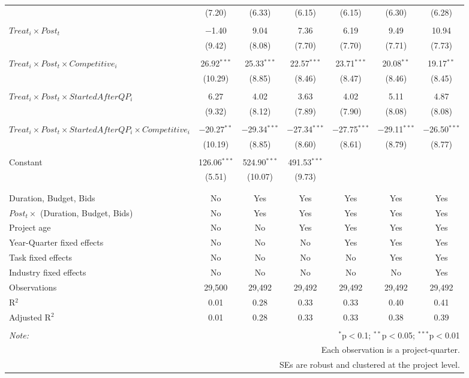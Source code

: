 \documentclass[
]{article}
\begin{document}
\begin{table}[H]
\begin{tabular}{@{\extracolsep{-3pt}}lcccccc}
  & (7.20) & (6.33) & (6.15) & (6.15) & (6.30) & (6.28) \\ 
  & & & & & & \\ 
 $Treat_i \times Post_t$ & $-$1.40 & 9.04 & 7.36 & 6.19 & 9.49 & 10.94 \\ 
  & (9.42) & (8.08) & (7.70) & (7.70) & (7.71) & (7.73) \\ 
  & & & & & & \\ 
 $Treat_i \times Post_t \times Competitive_i$ & 26.92$^{***}$ & 25.33$^{***}$ & 22.57$^{***}$ & 23.71$^{***}$ & 20.08$^{**}$ & 19.17$^{**}$ \\ 
  & (10.29) & (8.85) & (8.46) & (8.47) & (8.46) & (8.45) \\ 
  & & & & & & \\ 
 $Treat_i \times Post_t \times StartedAfterQP_i$ & 6.27 & 4.02 & 3.63 & 4.02 & 5.11 & 4.87 \\ 
  & (9.32) & (8.12) & (7.89) & (7.90) & (8.08) & (8.08) \\ 
  & & & & & & \\ 
 $Treat_i \times Post_t \times StartedAfterQP_i \times Competitive_i$ & $-$20.27$^{**}$ & $-$29.34$^{***}$ & $-$27.34$^{***}$ & $-$27.75$^{***}$ & $-$29.11$^{***}$ & $-$26.50$^{***}$ \\ 
  & (10.19) & (8.85) & (8.60) & (8.61) & (8.79) & (8.77) \\ 
  & & & & & & \\ 
 Constant & 126.06$^{***}$ & 524.90$^{***}$ & 491.53$^{***}$ &  &  &  \\ 
  & (5.51) & (10.07) & (9.73) &  &  &  \\ 
  & & & & & & \\ 
\hline \\[-1.8ex] 
Duration, Budget, Bids & No & Yes & Yes & Yes & Yes & Yes \\ 
$Post_t \times $  (Duration, Budget, Bids) & No & Yes & Yes & Yes & Yes & Yes \\ 
Project age & No & No & Yes & Yes & Yes & Yes \\ 
Year-Quarter fixed effects & No & No & No & Yes & Yes & Yes \\ 
Task fixed effects & No & No & No & No & Yes & Yes \\ 
Industry fixed effects & No & No & No & No & No & Yes \\ 
Observations & 29,500 & 29,492 & 29,492 & 29,492 & 29,492 & 29,492 \\ 
R$^{2}$ & 0.01 & 0.28 & 0.33 & 0.33 & 0.40 & 0.41 \\ 
Adjusted R$^{2}$ & 0.01 & 0.28 & 0.33 & 0.33 & 0.38 & 0.39 \\ 
\hline 
\hline \\[-1.8ex] 
\textit{Note:}  & \multicolumn{6}{r}{$^{*}$p$<$0.1; $^{**}$p$<$0.05; $^{***}$p$<$0.01} \\ 
 & \multicolumn{6}{r}{Each observation is a project-quarter.} \\ 
 & \multicolumn{6}{r}{SEs are robust and clustered at the project level.} \\ 
\end{tabular} 
\end{table}
\end{document}
